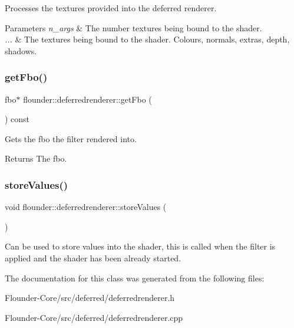 Processes the textures provided into the deferred renderer. 


\begin{DoxyParams}{Parameters}
{\em n\+\_\+args} & The number textures being bound to the shader. \\
\hline
{\em ...} & The textures being bound to the shader. Colours, normals, extras, depth, shadows. \\
\hline
\end{DoxyParams}
\mbox{\label{classflounder_1_1deferredrenderer_a59a752dd9810f3809ff9e29bc92636e9}} 
\subsubsection{\texorpdfstring{get\+Fbo()}{getFbo()}}
{\footnotesize\ttfamily fbo$\ast$ flounder\+::deferredrenderer\+::get\+Fbo (\begin{DoxyParamCaption}{ }\end{DoxyParamCaption}) const\hspace{0.3cm}{\ttfamily [inline]}}



Gets the fbo the filter rendered into. 

\begin{DoxyReturn}{Returns}
The fbo. 
\end{DoxyReturn}
\mbox{\label{classflounder_1_1deferredrenderer_a4385f75bb3b15be6c91da12851432226}} 
\subsubsection{\texorpdfstring{store\+Values()}{storeValues()}}
{\footnotesize\ttfamily void flounder\+::deferredrenderer\+::store\+Values (\begin{DoxyParamCaption}{ }\end{DoxyParamCaption})\hspace{0.3cm}{\ttfamily [private]}}



Can be used to store values into the shader, this is called when the filter is applied and the shader has been already started. 



The documentation for this class was generated from the following files\+:\begin{DoxyCompactItemize}
\item 
Flounder-\/\+Core/src/deferred/deferredrenderer.\+h\item 
Flounder-\/\+Core/src/deferred/deferredrenderer.\+cpp\end{DoxyCompactItemize}

